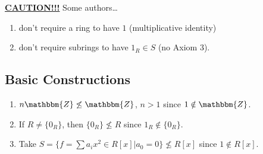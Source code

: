 \documentclass{article}
\newcommand{\Z}{\mathbbm{Z}}
\newcommand{\define}[1]{\textbf{\underline{#1}}}
\theoremstyle{definition}
\theoremstyle{remark}
\begin{document}
{            \noindent\define{CAUTION!!!} Some authors\ldots
            \begin{enumerate}
                \item don't require a ring to have $1$ (multiplicative identity)
                \item don't require subrings to have $1_R \in S$ (no Axiom 3).
            \end{enumerate}
        
        \subsection*{Basic Constructions}{
            \begin{enumerate}
                \item $n\Z \not\leq \Z$, $n>1$ since $1 \notin \Z$.
                \item If $R \neq \{0_R\}$, then $\{0_R\}\not\leq R$ since $1_R \notin \{0_R\}$.
                \item Take $S=\{f=\sum a_ix^2 \in R[x]|a_0=0\}\not\leq R[x]$ since $1 \notin R[x]$.
            \end{enumerate}
        }
    }
\end{document}
